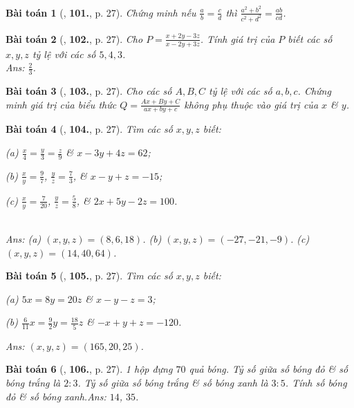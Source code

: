 \documentclass{article}
\numberwithin{equation}{section}
\newtheorem{baitoan}{Bài toán}
\begin{document}
\begin{baitoan}[\cite{Tuyen_Toan_7}, \textbf{101.}, p. 27]
	Chứng minh nếu $\frac{a}{b} = \frac{c}{d}$ thì $\frac{a^2 + b^2}{c^2 + d^2} = \frac{ab}{cd}$.
\end{baitoan}

\begin{baitoan}[\cite{Tuyen_Toan_7}, \textbf{102.}, p. 27]
	Cho $P = \frac{x + 2y - 3z}{x - 2y + 3z}$. Tính giá trị của $P$ biết các số $x,y,z$ tỷ lệ với các số $5,4,3$.\\\mbox{}\hfill{\sf Ans:} $\frac{2}{3}$.
\end{baitoan}

\begin{baitoan}[\cite{Tuyen_Toan_7}, \textbf{103.}, p. 27]
	Cho các số $A,B,C$ tỷ lệ với các số $a,b,c$. Chứng minh giá trị của biểu thức $Q = \frac{Ax + By + C}{ax + by + c}$ không phụ thuộc vào giá trị của $x$ \& $y$.
\end{baitoan}

\begin{baitoan}[\cite{Tuyen_Toan_7}, \textbf{104.}, p. 27]
	Tìm các số $x,y,z$ biết:
	\begin{enumerate*}
		\item[(a)] $\frac{x}{4} = \frac{y}{3} = \frac{z}{9}$ \& $x - 3y + 4z = 62$;
		\item[(b)] $\frac{x}{y} = \frac{9}{7}$, $\frac{y}{z} = \frac{7}{3}$, \& $x - y + z = -15$;
		\item[(c)] $\frac{x}{y} = \frac{7}{20}$, $\frac{y}{z} = \frac{5}{8}$, \& $2x + 5y - 2z = 100$.
	\end{enumerate*}\\\mbox{}\hfill{\sf Ans:} (a) $(x,y,z) = (8,6,18)$. (b) $(x,y,z) = (-27,-21,-9)$. (c) $(x,y,z) = (14,40,64)$.
\end{baitoan}

\begin{baitoan}[\cite{Tuyen_Toan_7}, \textbf{105.}, p. 27]
	Tìm các số $x,y,z$ biết:
	\begin{enumerate*}
		\item[(a)] $5x = 8y = 20z$ \& $x - y - z = 3$;
		\item[(b)] $\frac{6}{11}x = \frac{9}{2}y = \frac{18}{5}z$ \& $-x + y + z = -120$.
	\end{enumerate*}\hfill{\sf Ans:} $(x,y,z) = (165,20,25)$.
\end{baitoan}

\begin{baitoan}[\cite{Tuyen_Toan_7}, \textbf{106.}, p. 27]
	1 hộp đựng $70$ quả bóng. Tỷ số giữa số bóng đỏ \& số bóng trắng là $2:3$. Tỷ số giữa số bóng trắng \& số bóng xanh là $3:5$. Tính số bóng đỏ \& số bóng xanh.\hfill{\sf Ans:} $14$, $35$.
\end{baitoan}
\end{document}
